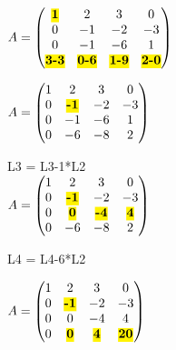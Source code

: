 \vspace{5mm} %

$
A =
\begin{pmatrix}
  \hl{\textbf{1}} & 2 & 3 & 0 \\
  0 & -1 & -2 & -3 \\
  0 & -1 & -6 & 1 \\
  \hl{\textbf{3-3}} & \hl{\textbf{0-6}} & \hl{\textbf{1-9}} & \hl{\textbf{2-0}} \\
\end{pmatrix}
$

\vspace{5mm} %

$
A =
\begin{pmatrix}
  1 & 2 & 3 & 0   \\
  0 & \hl{\textbf{-1}} & -2 & -3   \\
  0 & -1 & -6 & 1 \\
  0 & -6 & -8 & 2 \\
\end{pmatrix}
$

\vspace{5mm} %

L3 = L3-1*L2 \\

$
A =
\begin{pmatrix}
  1 & 2 & 3 & 0    \\
  0 & \hl{\textbf{-1}} & -2 & -3 \\
  0 & \hl{\textbf{0}} & \hl{\textbf{-4}} & \hl{\textbf{4}}   \\
  0 & -6 & -8 & 2  \\
\end{pmatrix}
$

\vspace{5mm} %

L4 = L4-6*L2 \\

\vspace{5mm} %

$
A =
\begin{pmatrix}
  1 & 2 & 3 & 0    \\
  0 & \hl{\textbf{-1}} & -2 & -3 \\
  0 & 0 & -4 & 4   \\
  0 & \hl{\textbf{0}} & \hl{\textbf{4}} & \hl{\textbf{20}}   \\
\end{pmatrix}
$

\vspace{5mm} %


